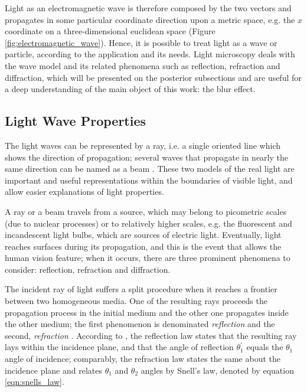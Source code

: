 Light as an electromagnetic wave is therefore composed by the two vectors and propagates in some particular coordinate direction upon a metric space, e.g. the $\mathit{x}$ coordinate on a three-dimensional euclidean space (Figure \ref{fig:electromagnetic_wave}). Hence, it is possible to treat light as a wave or particle, according to the application and its needs. Light microscopy deals with the wave model and its related phenomena such as reflection, refraction and diffraction, which will be presented on the posterior subsections and are useful for a deep understanding of the main object of this work: the blur effect.

\subsection{Light Wave Properties}

The light waves can be represented by a ray, i.e. a single oriented line which shows the direction of propagation; several waves that propagate in nearly the same direction can be named as a beam \cite{halliday2013fundamentals}. These two models of the real light are important and useful representations within the boundaries of visible light, and allow easier explanations of light properties.

A ray or a beam travels from a source, which may belong to picometric scales (due to nuclear processes) or to relatively higher scales, e.g. the fluorescent and incandescent light bulbs, which are sources of electric light. Eventually, light reaches surfaces during its propagation, and this is the event that allows the human vision feature; when it occurs, there are three prominent phenomena to consider: reflection, refraction and diffraction.

The incident ray of light suffers a split procedure when it reaches a frontier between two homogeneous media. One of the resulting rays proceeds the propagation process in the initial medium and the other one propagates inside the other medium; the first phenomenon is denominated \emph{reflection} and the second, \emph{refraction} \cite{born1999principles}. According to , the reflection law states that the resulting ray lays within the incidence plane, and that the angle of reflection $\mathit{\theta^{'}_{1}}$ equals the $\mathit{\theta_{1}}$ angle of incidence; comparably, the refraction law states the same about the incidence plane and relates $\mathit{\theta_{1}}$ and $\mathit{\theta_{2}}$ angles by Snell's law, denoted by equation \ref{eqn:snells_law}. 


